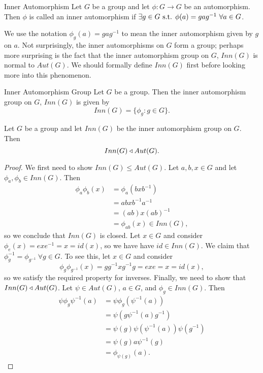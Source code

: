 \begin{definition}{Inner Automorphism}
    Let $G$ be a group and let $\phi: G\to G$ be an automorphism.
    Then $\phi$ is called an inner automorphism if $\exists g\in G\text{ s.t. } \phi(a)=gag^{-1}\ \forall a\in G$.
\end{definition}

We use the notation $\phi_{g}(a) = gag^{-1}$ to mean the inner automorphism given by $g$ on $a$.
Not surprisingly, the inner automorphisms on $G$ form a group; perhaps more surprising is the fact that the inner automorphism group on $G$, $Inn(G)$ is normal to $Aut(G)$.
We should formally define $Inn(G)$ first before looking more into this phenomenon.

\begin{definition}{Inner Automorphism Group}
    Let $G$ be a group. Then the inner automorphism group on $G$, $Inn(G)$ is given by
    \[
        Inn(G) = \{\phi_{g}: g\in G\}.
    \]
\end{definition}

\begin{theorem}{}
    Let $G$ be a group and let $Inn(G)$ be the inner automorphism group on $G$. Then
    \[
        Inn(G)\triangleleft Aut(G).
    \]
\end{theorem}
\begin{proof}
    We first need to show $Inn(G)\leq Aut(G)$.
    Let $a,b,x\in G$ and let $\phi_{a},\phi_{b}\in Inn(G)$. Then
    \begin{align*}
        \phi_{a}\phi_{b}(x) &= \phi_{a}(bxb^{-1})\\
        &= abxb^{-1}a^{-1}\\
        &= (ab)x(ab)^{-1}\\
        &= \phi_{ab}(x) \in Inn(G),
    \end{align*}
    so we conclude that $Inn(G)$ is closed.
    Let $x\in G$ and consider $\phi_{e}(x)=exe^{-1}=x=id(x)$, so we have have $id\in Inn(G)$.
    We claim that $\phi_{g}^{-1}=\phi_{g^{-1}}\ \forall g\in G$.
    To see this, let $x\in G$ and consider
    \[
        \phi_{g}\phi_{g^{-1}}(x)=gg^{-1}xg^{-1}g=exe=x=id(x),
    \]
    so we satisfy the required property for inverses.
    Finally, we need to show that $Inn(G)\triangleleft Aut(G)$.
    Let $\psi\in Aut(G)$, $a\in G$, and $\phi_{g}\in Inn(G)$. Then
    \begin{align*}
        \psi\phi_{g}\psi^{-1}(a) &= \psi\phi_{g}(\psi^{-1}(a))\\
        &= \psi(g\psi^{-1}(a)g^{-1})\\
        &= \psi(g)\psi(\psi^{-1}(a))\psi(g^{-1})\\
        &= \psi(g)a\psi^{-1}(g)\\
        &= \phi_{\psi(g)}(a).
    \end{align*}
\end{proof}

